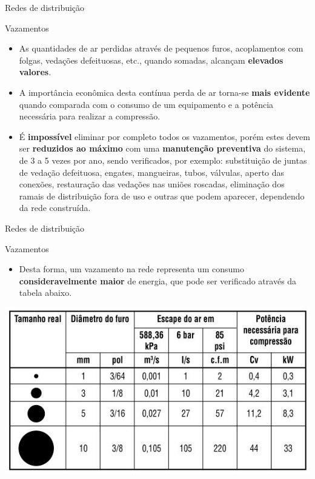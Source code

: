 \begin{frame}{Redes de distribuição}
	\begin{block}{Vazamentos}
		\begin{itemize}
			\item As quantidades de ar perdidas através de pequenos furos, acoplamentos com folgas, vedações defeituosas, etc., quando somadas, alcançam \textbf{elevados valores}.
			
			\item A importância econômica desta contínua perda de ar torna-se \textbf{mais evidente} quando comparada com o consumo de um equipamento e a potência necessária para realizar a compressão.
			
			\item É \textbf{impossível} eliminar por completo todos os vazamentos, porém estes devem ser \textbf{reduzidos ao máximo} com uma \textbf{manutenção preventiva} do sistema, de 3 a 5 vezes por ano, sendo verificados, por exemplo: substituição de juntas de vedação defeituosa, engates, mangueiras, tubos, válvulas, aperto das conexões, restauração das vedações nas uniões roscadas, eliminação dos ramais de distribuição fora de uso e outras que podem aparecer, dependendo da rede construída.
		\end{itemize}
	\end{block}
\end{frame}


\begin{frame}{Redes de distribuição}
	\begin{block}{Vazamentos}
		\begin{itemize}
			\item Desta forma, um vazamento na rede representa um consumo \textbf{consideravelmente maior} de energia, que pode ser verificado através da tabela abaixo.
		\end{itemize}
		
	\end{block}
	
	\centering
	\includegraphics[width=0.8\linewidth]{Figuras/Ch13/fig15}
	
\end{frame}


